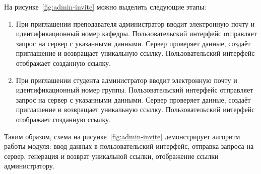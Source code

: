 На рисунке~\ref{fig:admin-invite} можно выделить следующие этапы:
\begin{enumerate}
    \item При приглашении преподавателя администратор вводит электронную почту и идентификационный номер кафедры. Пользовательский интерфейс отправляет запрос на сервер с указанными данными. Сервер проверяет данные, создаёт приглашение и возвращает уникальную ссылку. Пользовательский интерфейс отображает созданную ссылку.

    \item При приглашении студента администратор вводит электронную почту и идентификационный номер группы. Пользовательский интерфейс отправляет запрос на сервер с указанными данными. Сервер проверяет данные, создаёт приглашение и возвращает уникальную ссылку. Пользовательский интерфейс отображает созданную ссылку.
\end{enumerate}

Таким образом, схема на рисунке~\ref{fig:admin-invite} демонстрирует алгоритм работы модуля: ввод данных в пользовательский интерфейс, отправка запроса на сервер, генерация и возврат уникальной ссылки, отображение ссылки администратору.

